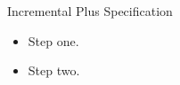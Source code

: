 \documentclass[14pt,t]{beamer-accessibility}
\begin{document}
\begin{frame}{Incremental Plus Specification}
\begin{itemize}[<+->]
\item Step one.
\item Step two.
\end{itemize}
\end{frame}
\end{document}
